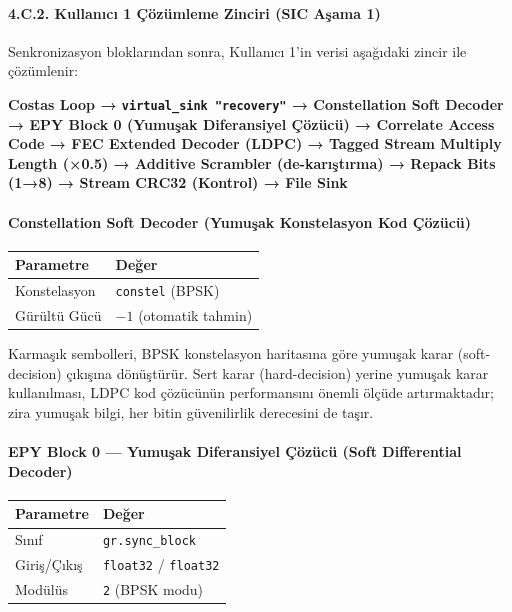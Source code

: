 \documentclass[
]{IEEEtran}
\newcounter{none} %
\begin{document}
\paragraph{4.C.2. Kullanıcı 1 Çözümleme Zinciri (SIC Aşama
1)}\label{c.2.-kullanux131cux131-1-uxe7uxf6zuxfcmleme-zinciri-sic-aux15fama-1}

Senkronizasyon bloklarından sonra, Kullanıcı 1'in verisi aşağıdaki
zincir ile çözümlenir:

\textbf{Costas Loop → \texttt{virtual\_sink\ "recovery"} → Constellation
Soft Decoder → EPY Block 0 (Yumuşak Diferansiyel Çözücü) → Correlate
Access Code → FEC Extended Decoder (LDPC) → Tagged Stream Multiply
Length (×0.5) → Additive Scrambler (de-karıştırma) → Repack Bits (1→8) →
Stream CRC32 (Kontrol) → File Sink}

\paragraph{Constellation Soft Decoder (Yumuşak Konstelasyon Kod
Çözücü)}\label{constellation-soft-decoder-yumuux15fak-konstelasyon-kod-uxe7uxf6zuxfccuxfc}

{\def\LTcaptype{none} %
\begin{longtable}[]{@{}ll@{}}
\toprule\noalign{}
Parametre & Değer \\
\midrule\noalign{}
\endhead
\bottomrule\noalign{}
\endlastfoot
Konstelasyon & \texttt{constel} (BPSK) \\
Gürültü Gücü & \(-1\) (otomatik tahmin) \\
\end{longtable}
}

Karmaşık sembolleri, BPSK konstelasyon haritasına göre yumuşak karar
(soft-decision) çıkışına dönüştürür. Sert karar (hard-decision) yerine
yumuşak karar kullanılması, LDPC kod çözücünün performansını önemli
ölçüde artırmaktadır; zira yumuşak bilgi, her bitin güvenilirlik
derecesini de taşır.

\paragraph{EPY Block 0 --- Yumuşak Diferansiyel Çözücü (Soft
Differential
Decoder)}\label{epy-block-0-yumuux15fak-diferansiyel-uxe7uxf6zuxfccuxfc-soft-differential-decoder}

{\def\LTcaptype{none} %
\begin{longtable}[]{@{}ll@{}}
\toprule\noalign{}
Parametre & Değer \\
\midrule\noalign{}
\endhead
\bottomrule\noalign{}
\endlastfoot
Sınıf & \texttt{gr.sync\_block} \\
Giriş/Çıkış & \texttt{float32} / \texttt{float32} \\
Modülüs & \texttt{2} (BPSK modu) \\
\end{longtable}
}
\end{document}
